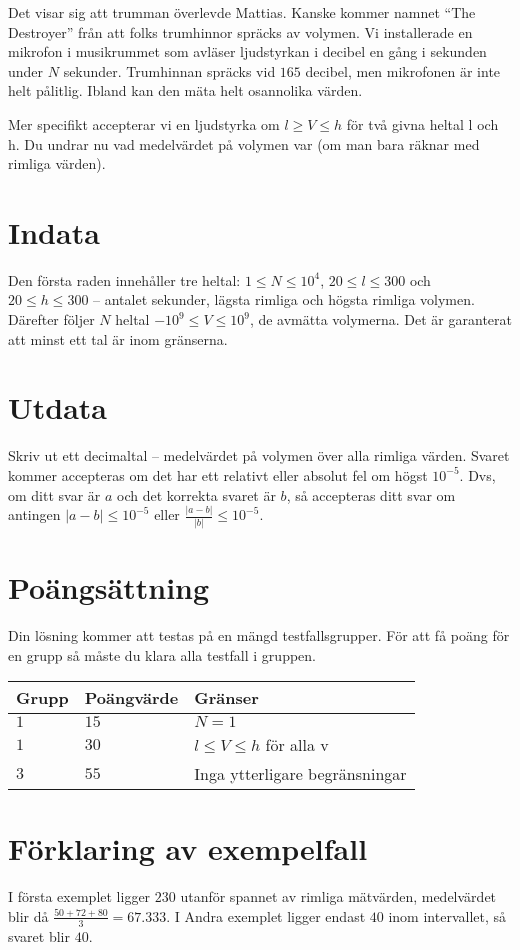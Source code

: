 Det visar sig att trumman överlevde Mattias. Kanske kommer namnet ``The Destroyer'' från att folks trumhinnor spräcks av volymen.
Vi installerade en mikrofon i musikrummet som avläser ljudstyrkan i decibel en gång i sekunden under $N$ sekunder. 
Trumhinnan spräcks vid $165$ decibel, men mikrofonen är inte helt pålitlig. Ibland kan den mäta helt osannolika värden.

Mer specifikt accepterar vi en ljudstyrka om $l \ge V \leq h$ för två givna heltal l och h. Du undrar nu vad medelvärdet på volymen var (om man bara räknar med rimliga värden).


\section*{Indata}
Den första raden innehåller tre heltal: $1\leq N \leq 10^4$, $20 \leq l \leq 300$ och $20 \leq h \leq 300$  -- antalet sekunder, lägsta rimliga och högsta rimliga volymen. 
Därefter följer $N$ heltal $-10^9 \leq V \leq 10^9$, de avmätta volymerna.
Det är garanterat att minst ett tal är inom gränserna.

\section*{Utdata}
Skriv ut ett decimaltal -- medelvärdet på volymen över alla rimliga värden.
Svaret kommer accepteras om det har ett relativt eller absolut fel om högst $10^{-5}$.
Dvs, om ditt svar är $a$ och det korrekta svaret är $b$, så accepteras ditt svar om
antingen $|a-b| \le 10^{-5}$ eller $\frac{|a-b|}{|b|} \le 10^{-5}$.

\section*{Poängsättning}
Din lösning kommer att testas på en mängd testfallsgrupper.
För att få poäng för en grupp så måste du klara alla testfall i gruppen.

\noindent
\begin{tabular}{| l | l | p{12cm} |}
  \hline
  Grupp & Poängvärde & Gränser \\ \hline
  $1$   & $15$       & $N=1$ \\ \hline
  $1$   & $30$       & $l \leq V \leq h$ för alla v \\ \hline
  $3$   & $55$       & Inga ytterligare begränsningar \\ \hline
\end{tabular}

\section*{Förklaring av exempelfall}
I första exemplet ligger $230$ utanför spannet av rimliga mätvärden, medelvärdet blir då $\frac{50+72+80}{3} = 67.333$.
I Andra exemplet ligger endast $40$ inom intervallet, så svaret blir $40$.
